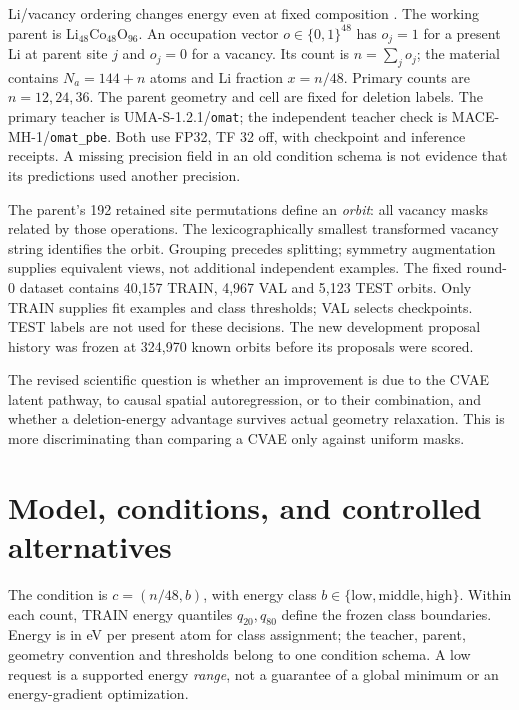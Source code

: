 \documentclass[10pt]{article}
\begin{document}
Li/vacancy ordering changes energy even at fixed composition
\cite{vanderVen1998}. The working parent is Li$_{48}$Co$_{48}$O$_{96}$.
An occupation vector $o\in\{0,1\}^{48}$ has $o_j=1$ for a present Li at parent
site $j$ and $o_j=0$ for a vacancy. Its count is $n=\sum_j o_j$; the material
contains $N_a=144+n$ atoms and Li fraction $x=n/48$. Primary counts are
$n=12,24,36$. The parent geometry and cell are fixed for deletion labels.
The primary teacher is UMA-S-1.2.1/\texttt{omat}; the independent teacher check is
MACE-MH-1/\texttt{omat\_pbe}. Both use FP32, TF 32 off, with checkpoint and
inference receipts. A missing precision field in an old condition schema is not
evidence that its predictions used another precision.

The parent's 192 retained site permutations define an \emph{orbit}: all vacancy
masks related by those operations. The lexicographically smallest transformed
vacancy string identifies the orbit. Grouping precedes splitting; symmetry
augmentation supplies equivalent views, not additional independent examples.
The fixed round-0 dataset contains 40,157 TRAIN, 4,967 VAL and 5,123 TEST orbits.
Only TRAIN supplies fit examples and class thresholds; VAL selects checkpoints.
TEST labels are not used for these decisions. The new development proposal
history was frozen at 324,970 known orbits before its proposals were scored.

The revised scientific question is whether an improvement is due to the CVAE
latent pathway, to causal spatial autoregression, or to their combination, and
whether a deletion-energy advantage survives actual geometry relaxation.
This is more discriminating than comparing a CVAE only against uniform masks.
\newpage

\section{Model, conditions, and controlled alternatives}
The condition is $c=(n/48,b)$, with energy class $b\in\{\mathrm{low},\mathrm{middle},
\mathrm{high}\}$. Within each count, TRAIN energy quantiles $q_{20},q_{80}$ define
the frozen class boundaries. Energy is in eV per present atom for class
assignment; the teacher, parent, geometry convention and thresholds belong to
one condition schema. A low request is a supported energy \emph{range}, not a
guarantee of a global minimum or an energy-gradient optimization.
\end{document}

